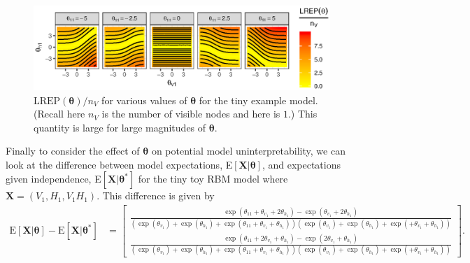 \documentclass[AMS,STIX1COL]{WileyNJD-v2}
\newcommand{\nv}{{n_{\scriptscriptstyle V}}}
\begin{document}
\par

\begin{figure}

{\centering \includegraphics{paper_files/figure-latex/instab-1} 

}

\caption{$\label{fig:instab}\text{LREP}(\boldsymbol \theta)/\nv$ for various values of $\boldsymbol \theta$ for the tiny example model. (Recall here $\nv$ is the number of visible nodes and here is $1$.) This quantity is large for large magnitudes of $\boldsymbol \theta$.}\label{fig:instab}
\end{figure}

Finally to consider the effect of \(\boldsymbol \theta\) on potential
model uninterpretability, we can look at the difference between model
expectations, E\(\left[\boldsymbol X | \boldsymbol \theta\right]\), and
expectations given independence,
E\(\left[\boldsymbol X | \boldsymbol \theta^*\right ]\) for the tiny toy
RBM model where \(\boldsymbol X = (V_1, H_1, V_1 H_1)\). This difference
is given by \begin{align*}
\text{E}\left[\boldsymbol X | \boldsymbol \theta\right] -   \text{E}\left[\boldsymbol X | \boldsymbol \theta^* \right] 
&= \left[
\begin{matrix}
\frac{\exp\left(\theta_{11} + \theta_{v_1} + 2\theta_{h_1}\right) - \exp\left( \theta_{v_1} + 2\theta_{h_1}\right) }{\left(\exp\left(\theta_{v_1}\right) + \exp\left(\theta_{h_1}\right) + \exp\left(\theta_{11} + \theta_{v_1} + \theta_{h_1}\right)\right)\left(\exp\left(\theta_{v_1}\right) + \exp\left(\theta_{h_1}\right) + \exp\left(+ \theta_{v_1} + \theta_{h_1}\right)\right)} \\
\frac{\exp\left(\theta_{11} + 2\theta_{v_1} + \theta_{h_1}\right) - \exp\left( 2\theta_{v_1} + \theta_{h_1}\right)  }{\left(\exp\left(\theta_{v_1}\right) + \exp\left(\theta_{h_1}\right) + \exp\left(\theta_{11} + \theta_{v_1} + \theta_{h_1}\right)\right)\left(\exp\left(\theta_{v_1}\right) + \exp\left(\theta_{h_1}\right) + \exp\left(+ \theta_{v_1} + \theta_{h_1}\right)\right)}
\end{matrix}\right].
\end{align*}
\end{document}
